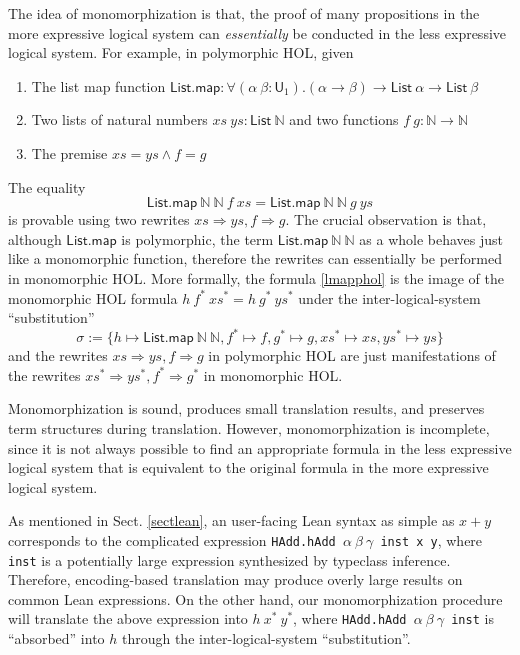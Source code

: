   The idea of monomorphization is that, the proof of many propositions in the more expressive logical
  system can \textit{essentially} be conducted in the less expressive logical system. For example,
  in polymorphic HOL, given
  \begin{enumerate}
    \item The list map function $\mathsf{List.map} : \forall (\alpha \ \beta : \mathsf{U}_1). (\alpha \to \beta) \to \mathsf{List} \ \alpha \to \mathsf{List} \ \beta$
    \item Two lists of natural numbers $xs \ ys : \mathsf{List} \ \mathbb{N}$ and two functions $f \ g : \mathbb{N} \to \mathbb{N}$
    \item The premise $xs = ys \land f = g$
  \end{enumerate}
  The equality
  \begin{equation}\label{lmapphol}
    \mathsf{List.map} \ \mathbb{N} \ \mathbb{N} \ f \ xs = \mathsf{List.map} \ \mathbb{N} \ \mathbb{N} \ g \ ys
  \end{equation}
  is provable using two rewrites $xs \Rightarrow ys, f \Rightarrow g$. The crucial observation is that, although $\textsf{List.map}$ is polymorphic, the term
  $\mathsf{List.map} \ \mathbb{N} \ \mathbb{N}$ as a whole behaves just like a monomorphic function,
  therefore the rewrites can essentially be performed in monomorphic HOL. More formally,
  the formula \eqref{lmapphol} is the image of the monomorphic HOL formula $h \ f^* \ xs^* = h \ g^* \ ys^*$
  under the inter-logical-system ``substitution''
  $$\sigma := \{h \mapsto \mathsf{List.map} \ \mathbb{N} \ \mathbb{N},
    f^* \mapsto f, g^* \mapsto g, xs^* \mapsto xs, ys^* \mapsto ys\}$$
  and the rewrites $xs \Rightarrow ys, f \Rightarrow g$ in polymorphic HOL are just manifestations of the
  rewrites $xs^* \Rightarrow ys^*, f^* \Rightarrow g^*$ in monomorphic HOL.
  
  Monomorphization is sound, produces small translation results, and preserves
  term structures during translation. However, monomorphization is incomplete,
  since it is not always possible to find an appropriate formula in the less
  expressive logical system that is equivalent to the original formula
  in the more expressive logical system.


  As mentioned in Sect. \ref{sectlean}, an user-facing Lean syntax as simple as $x + y$ corresponds to
  the complicated expression \texttt{HAdd.hAdd $\alpha \ \beta \ \gamma$ inst x y}, where \texttt{inst}
  is a potentially large expression synthesized by typeclass inference. Therefore,
  encoding-based translation may produce overly large results on common Lean expressions.
  On the other hand, our monomorphization procedure will translate the above expression
  into $h \ x^* \ y^*$, where \texttt{HAdd.hAdd $\alpha \ \beta \ \gamma$ inst}
  is ``absorbed'' into $h$ through the inter-logical-system ``substitution''.